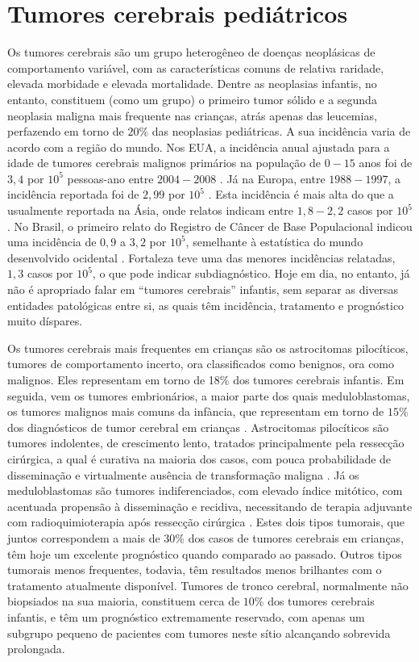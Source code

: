 \documentclass[graybox]{svmult}
\begin{document}
\section{Tumores cerebrais pediátricos}
\label{sec:1}
Os tumores cerebrais são um grupo heterogêneo de doenças neoplásicas de comportamento variável, com as características comuns de relativa raridade, elevada morbidade e elevada mortalidade. Dentre as neoplasias infantis, no entanto, constituem (como um grupo) o primeiro tumor sólido e a segunda neoplasia maligna mais frequente nas crianças, atrás apenas das leucemias, perfazendo em torno de \(20\%\) das neoplasias pediátricas. A sua incidência varia de acordo com a região do mundo. Nos EUA, a incidência anual ajustada para a idade de tumores cerebrais malignos primários na população de \(0-15\) anos foi de \(3,4\) por \(10^5\) pessoas-ano entre \(2004-2008\) \cite{Ostrom01102014}. Já na Europa, entre \(1988-1997\), a incidência reportada foi de \(2,99\) por \(10^5\) \cite{Peris-Bonet}. Esta incidência é mais alta do que a usualmente reportada na Ásia, onde relatos indicam entre \(1,8-2,2\) casos por \(10^5\) \cite{CNCR21430}. No Brasil, o primeiro relato do Registro de Câncer de Base Populacional indicou uma incidência de \(0,9\) a \(3,2\) por \(10^5\), semelhante à estatística do mundo desenvolvido ocidental \cite{IJC24799}. Fortaleza teve uma das menores incidências relatadas, \(1,3\) casos por \(10^5\), o que pode indicar subdiagnóstico. Hoje em dia, no entanto, já não é apropriado falar em “tumores cerebrais” infantis, sem separar as diversas entidades patológicas entre si, as quais têm incidência, tratamento e prognóstico muito díspares.

Os tumores cerebrais mais frequentes em crianças são os astrocitomas pilocíticos, tumores de comportamento incerto, ora classificados como benignos, ora como malignos. Eles representam em torno de 1\(8\%\) dos tumores cerebrais infantis. Em seguida, vem os tumores embrionários, a maior parte dos quais meduloblastomas, os tumores malignos mais comuns da infància, que representam em torno de \(15\%\) dos diagnósticos de tumor cerebral em crianças \cite{Ostrom01102014}. Astrocitomas pilocíticos são tumores indolentes, de crescimento lento, tratados principalmente pela ressecção cirúrgica, a qual é curativa na maioria dos casos, com pouca probabilidade de disseminação e virtualmente ausência de transformação maligna \cite{gan}. Já os meduloblastomas são tumores indiferenciados, com elevado índice mitótico, com acentuada propensão à disseminação e recidiva, necessitando de terapia adjuvante com radioquimioterapia após ressecção cirúrgica \cite{partap}. Estes dois tipos tumorais, que juntos correspondem a mais de \(30\%\) dos casos de tumores cerebrais em crianças, têm hoje um excelente prognóstico quando comparado ao passado. Outros tipos tumorais menos frequentes, todavia, têm resultados menos brilhantes com o tratamento atualmente disponível. Tumores de tronco cerebral, normalmente não biopsiados na sua maioria, constituem cerca de \(10\%\) dos tumores cerebrais infantis, e têm um prognóstico extremamente reservado, com apenas um subgrupo pequeno de pacientes com tumores neste sítio alcançando sobrevida prolongada.
\end{document}
